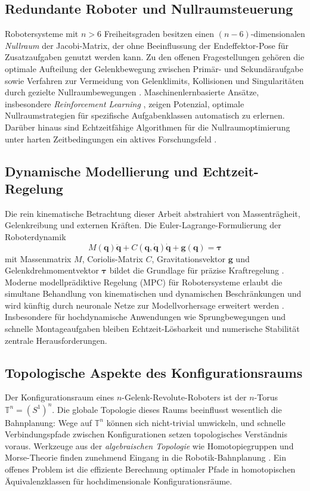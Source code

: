﻿\documentclass[a4paper,12pt]{article}
\theoremstyle{definition}
\begin{document}
\subsection{Redundante Roboter und Nullraumsteuerung}

Robotersysteme mit $n > 6$ Freiheitsgraden besitzen einen $(n-6)$-dimensionalen \emph{Nullraum} der Jacobi-Matrix, der ohne Beeinflussung der Endeffektor-Pose für Zusatzaufgaben genutzt werden kann. Zu den offenen Fragestellungen gehören die optimale Aufteilung der Gelenkbewegung zwischen Primär- und Sekundäraufgabe sowie Verfahren zur Vermeidung von Gelenklimits, Kollisionen und Singularitäten durch gezielte Nullraumbewegungen \cite{liegeois1977automatic}. Maschinenlernbasierte Ansätze, insbesondere \emph{Reinforcement Learning} \cite{sutton2018reinforcement}, zeigen Potenzial, optimale Nullraumstrategien für spezifische Aufgabenklassen automatisch zu erlernen. Darüber hinaus sind Echtzeitfähige Algorithmen für die Nullraumoptimierung unter harten Zeitbedingungen ein aktives Forschungsfeld \cite{siciliano2009robotics}.

\subsection{Dynamische Modellierung und Echtzeit-Regelung}

Die rein kinematische Betrachtung dieser Arbeit abstrahiert von Massenträgheit, Gelenkreibung und externen Kräften. Die Euler-Lagrange-Formulierung der Roboterdynamik
\[
	M(\mathbf{q})\ddot{\mathbf{q}} + C(\mathbf{q},\dot{\mathbf{q}})\dot{\mathbf{q}} + \mathbf{g}(\mathbf{q}) = \boldsymbol{\tau}
\]
mit Massenmatrix $M$, Coriolis-Matrix $C$, Gravitationsvektor $\mathbf{g}$ und Gelenkdrehmomentvektor $\boldsymbol{\tau}$ bildet die Grundlage für präzise Kraftregelung \cite{spong2020robot}. Moderne modellprädiktive Regelung (MPC) für Robotersysteme erlaubt die simultane Behandlung von kinematischen und dynamischen Beschränkungen und wird künftig durch neuronale Netze zur Modellvorhersage erweitert werden \cite{rawlings2017model}. Insbesondere für hochdynamische Anwendungen wie Sprungbewegungen und schnelle Montageaufgaben bleiben Echtzeit-Lösbarkeit und numerische Stabilität zentrale Herausforderungen.

\subsection{Topologische Aspekte des Konfigurationsraums}

Der Konfigurationsraum eines $n$-Gelenk-Revolute-Roboters ist der $n$-Torus $\mathbb{T}^n = (S^1)^n$. Die globale Topologie dieses Raums beeinflusst wesentlich die Bahnplanung: Wege auf $\mathbb{T}^n$ können sich nicht-trivial umwickeln, und schnelle Verbindungspfade zwischen Konfigurationen setzen topologisches Verständnis voraus. Werkzeuge aus der \emph{algebraischen Topologie} wie Homotopiegruppen und Morse-Theorie finden zunehmend Eingang in die Robotik-Bahnplanung \cite{lavalle2006planning}. Ein offenes Problem ist die effiziente Berechnung optimaler Pfade in homotopischen Äquivalenzklassen für hochdimensionale Konfigurationsräume.
\end{document}

